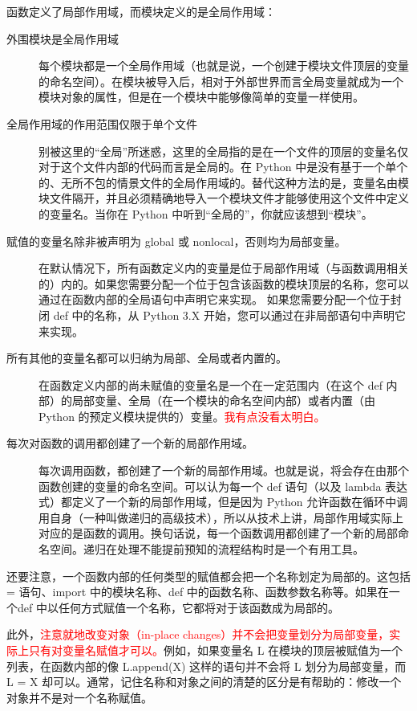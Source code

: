 函数定义了局部作用域，而模块定义的是全局作用域：
\begin{description}
    \item[外围模块是全局作用域]每个模块都是一个全局作用域（也就是说，一个创建于模块文件顶层的变量的命名空间）。在模块被导入后，相对于外部世界而言全局变量就成为一个模块对象的属性，但是在一个模块中能够像简单的变量一样使用。
    \item[全局作用域的作用范围仅限于单个文件]别被这里的“全局”所迷惑，这里的全局指的是在一个文件的顶层的变量名仅对于这个文件内部的代码而言是全局的。在 Python 中是没有基于一个单个的、无所不包的情景文件的全局作用域的。替代这种方法的是，变量名由模块文件隔开，并且必须精确地导入一个模块文件才能够使用这个文件中定义的变量名。当你在 Python 中听到“全局的”，你就应该想到“模块”。
    \item[赋值的变量名除非被声明为 global 或 nonlocal，否则均为局部变量。]在默认情况下，所有函数定义内的变量是位于局部作用域（与函数调用相关的）内的。如果您需要分配一个位于包含该函数的模块顶层的名称，您可以通过在函数内部的全局语句中声明它来实现。 如果您需要分配一个位于封闭 def 中的名称，从 Python 3.X 开始，您可以通过在非局部语句中声明它来实现。
    \item[所有其他的变量名都可以归纳为局部、全局或者内置的。]在函数定义内部的尚未赋值的变量名是一个在一定范围内（在这个 def 内部）的局部变量、全局（在一个模块的命名空间内部）或者内置（由 Python 的预定义模块提供的）变量。\textcolor{red}{我有点没看太明白。}
    \item[每次对函数的调用都创建了一个新的局部作用域。]每次调用函数，都创建了一个新的局部作用域。也就是说，将会存在由那个函数创建的变量的命名空间。可以认为每一个 def 语句（以及 lambda 表达式）都定义了一个新的局部作用域，但是因为 Python 允许函数在循环中调用自身（一种叫做递归的高级技术），所以从技术上讲，局部作用域实际上对应的是函数的调用。换句话说，每一个函数调用都创建了一个新的局部命名空间。递归在处理不能提前预知的流程结构时是一个有用工具。
\end{description}

还要注意，一个函数内部的任何类型的赋值都会把一个名称划定为局部的。这包括 = 语句、import 中的模块名称、def 中的函数名称、函数参数名称等。如果在一个def 中以任何方式赋值一个名称，它都将对于该函数成为局部的。

此外，\textcolor{red}{注意就地改变对象（in-place changes）并不会把变量划分为局部变量，实际上只有对变量名赋值才可以。}例如，如果变量名 L 在模块的顶层被赋值为一个列表，在函数内部的像 L.append(X) 这样的语句并不会将 L 划分为局部变量，而 L = X 却可以。通常，记住名称和对象之间的清楚的区分是有帮助的：修改一个对象并不是对一个名称赋值。
